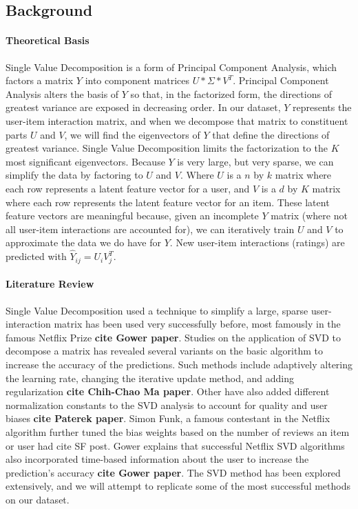 \documentclass[12pt]{article}
\begin{document}
\subsection{Background}
\paragraph{Theoretical Basis} Single Value Decomposition is a form of Principal Component Analysis, which factors a matrix $Y$ into component matrices $U * \Sigma * V^{T}$. Principal Component Analysis alters the basis of $Y$ so that, in the factorized form, the directions of greatest variance are exposed in decreasing order. In our dataset, $Y$ represents the user-item interaction matrix, and when we decompose that matrix to constituent parts $U$ and $V$, we will find the eigenvectors of $Y$ that define the directions of greatest variance. Single Value Decomposition limits the factorization to the $K$ most significant eigenvectors. Because $Y$ is very large, but very sparse, we can simplify the data by factoring to $U$ and $V$. Where $U$ is a $n$ by $k$ matrix where each row represents a latent feature vector for a user, and $V$ is a $d$ by $K$ matrix where each row represents the latent feature vector for an item. These latent feature vectors are meaningful because, given an incomplete $Y$ matrix (where not all user-item interactions are accounted for), we can iteratively train $U$ and $V$ to approximate the data we do have for $Y$. New user-item interactions (ratings) are predicted with $\hat{Y}_{ij} = U_{i}V_{j}^{T}$.

\paragraph{Literature Review} Single Value Decomposition used a technique to simplify a large, sparse user-interaction matrix has been used very successfully before, most famously in the famous Netflix Prize \textbf{cite Gower paper}. Studies on the application of SVD to decompose a matrix has revealed several variants on the basic algorithm to increase the accuracy of the predictions. Such methods include adaptively altering the learning rate, changing the iterative update method, and adding regularization \textbf{cite Chih-Chao Ma paper}. Other have also added different normalization constants to the SVD analysis to account for quality and user biases \textbf{cite Paterek paper}. Simon Funk, a famous contestant in the Netflix algorithm further tuned the bias weights based on the number of reviews an item or user had {cite SF post}. Gower explains that successful Netflix SVD algorithms also incorporated time-based information about the user to increase the prediction's accuracy \textbf{cite Gower paper}. The SVD method has been explored extensively, and we will attempt to replicate some of the most successful methods on our dataset.
  
\end{document}
